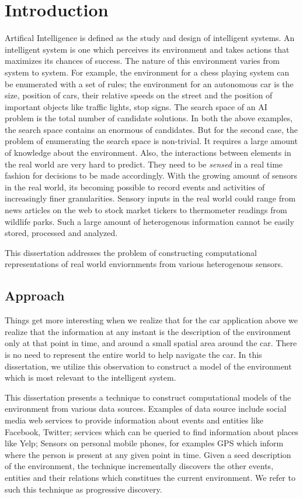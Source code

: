 \chapter{Introduction}

Artifical Intelligence is defined as the study and design of intelligent systems. An intelligent system is one which perceives its environment and takes actions that maximizes its chances of success. The nature of this environment varies from system to system. For example, the environment for a chess playing system can be enumerated with a set of rules; the environment for an autonomous car is the size, position of cars, their relative speeds on the street and the position of important objects like traffic lights, stop signs. The search space of an AI problem is the total number of candidate solutions. In both the above examples, the search space contains an enormous of candidates. But for the second case, the problem of enumerating the search space is non-trivial. It requires a large amount of knowledge about the environment. Also, the interactions between elements in the real world are very hard to predict. They need to be \textit{sensed} in a real time fashion for decisions to be made accordingly. With the growing amount of sensors in the real world, its becoming possible to record events and activities of increasingly finer granularities. Sensory inputs in the real world could range from news articles on the web to stock market tickers to thermometer readings from wildlife parks. Such a large amount of heterogenous information cannot be easily stored, processed and analyzed. 

This dissertation addresses the problem of constructing computational representations of real world enviornments from various heterogenous sensors.

\section{Approach}
Things get more interesting when we realize that for the car application above we realize that the information at any instant is the description of the environment only at that point in time, and around a small spatial area around the car. There is no need to represent the entire world to help navigate the car. In this dissertation, we utilize this observation to construct a model of the environment which is most relevant to the intelligent system.

This dissertation presents a technique to construct computational models of the environment from various data sources. Examples of data source include social media web services to provide information about events and entities like Facebook, Twitter; services which can be queried to find information about places like Yelp; Sensors on personal mobile phones, for examples GPS which inform where the person is present at any given point in time. Given a seed description of the environment, the technique incrementally discovers the other events, entities and their relations which constitues the current environment. We refer to such this technique as progressive discovery. 

